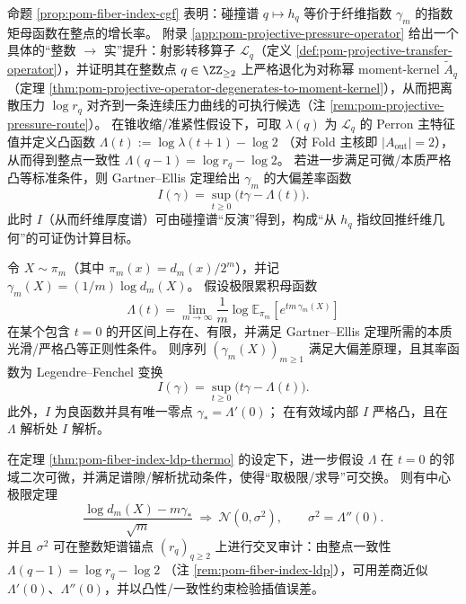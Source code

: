 \begin{remark}\label{rem:pom-fiber-index-ldp}
命题 \ref{prop:pom-fiber-index-cgf} 表明：碰撞谱 \(q\mapsto h_q\) 等价于纤维指数 \(\gamma_m\) 的指数矩母函数在整点的增长率。
附录 \ref{app:pom-projective-pressure-operator} 给出一个具体的“整数 \(\to\) 实”提升：射影转移算子 \(\mathcal{L}_q\)（定义 \ref{def:pom-projective-transfer-operator}），并证明其在整数点 \(q\in\ZZ_{\ge 2}\) 上严格退化为对称幂 moment-kernel \(\widetilde A_q\)（定理 \ref{thm:pom-projective-operator-degenerates-to-moment-kernel}），从而把离散压力 \(\log r_q\) 对齐到一条连续压力曲线的可执行候选（注 \ref{rem:pom-projective-pressure-route}）。
在锥收缩/准紧性假设下，可取 \(\lambda(q)\) 为 \(\mathcal{L}_q\) 的 Perron 主特征值并定义凸函数
\(
\Lambda(t):=\log\lambda(t+1)-\log 2
\)
（对 Fold 主核即 \(|A_{\mathrm{out}}|=2\)），从而得到整点一致性
\(
\Lambda(q-1)=\log r_q-\log 2
\)。
若进一步满足可微/本质严格凸等标准条件，则 Gartner--Ellis 定理给出 \(\gamma_m\) 的大偏差率函数
\[
I(\gamma)=\sup_{t\ge 0}\bigl(t\gamma-\Lambda(t)\bigr).
\]
此时 \(I\)（从而纤维厚度谱）可由碰撞谱“反演”得到，构成“从 \(h_q\) 指纹回推纤维几何”的可证伪计算目标。
\end{remark}

\begin{theorem}\label{thm:pom-fiber-index-ldp-thermo}
令 \(X\sim\pi_m\)（其中 \(\pi_m(x)=d_m(x)/2^m\)），并记
\(
\gamma_m(X)=(1/m)\log d_m(X)
\)。
假设极限累积母函数
\[
\Lambda(t)=\lim_{m\to\infty}\frac{1}{m}\log \mathbb{E}_{\pi_m}\!\left[e^{t m\,\gamma_m(X)}\right]
\]
在某个包含 \(t=0\) 的开区间上存在、有限，并满足 Gartner--Ellis 定理所需的本质光滑/严格凸等正则性条件。
则序列 \((\gamma_m(X))_{m\ge 1}\) 满足大偏差原理，且其率函数为 Legendre--Fenchel 变换
\[
I(\gamma)=\sup_{t\ge 0}\bigl(t\gamma-\Lambda(t)\bigr).
\]
此外，\(I\) 为良函数并具有唯一零点
\(
\gamma_\ast=\Lambda'(0)
\)；
在有效域内部 \(I\) 严格凸，且在 \(\Lambda\) 解析处 \(I\) 解析。
\end{theorem}

\begin{theorem}[中心极限定理与二阶常数的可审计性]\label{thm:pom-fiber-index-clt-thermo}
在定理 \ref{thm:pom-fiber-index-ldp-thermo} 的设定下，进一步假设 \(\Lambda\) 在 \(t=0\) 的邻域二次可微，并满足谱隙/解析扰动条件，使得“取极限/求导”可交换。
则有中心极限定理
\[
\frac{\log d_m(X)-m\gamma_\ast}{\sqrt m}\ \Longrightarrow\ \mathcal N(0,\sigma^2),
\qquad
\sigma^2=\Lambda''(0).
\]
并且 \(\sigma^2\) 可在整数矩谱锚点 \((r_q)_{q\ge 2}\) 上进行交叉审计：由整点一致性
\(
\Lambda(q-1)=\log r_q-\log 2
\)
（注 \ref{rem:pom-fiber-index-ldp}），可用差商近似 \(\Lambda'(0)\)、\(\Lambda''(0)\)，并以凸性/一致性约束检验插值误差。
\end{theorem}

